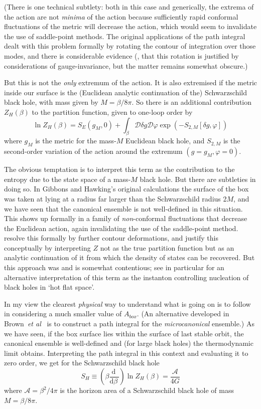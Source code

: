 \documentclass{article}
\newcommand{\dr}[1]{\ensuremath{\mathrm{d} #1\,}}
\newcommand{\mc}[1]{\ensuremath{\mathcal{#1}}}
\newcommand{\dbd}[2]{\ensuremath{\frac{\dr{#1}}{\dr{#2}}}}
\newcommand{\be}{\begin{equation}}
\newcommand{\ee}{\end{equation}}
\begin{document}
(There is one technical subtlety: both in this case and generically, the extrema of the action are not \emph{minima} of the action because sufficiently rapid conformal fluctuations of the metric will decrease the action, which would seem to invalidate the use of saddle-point methods. The original applications of the path integral \cite{gibbonshawkingperry} dealt with this problem formally by rotating the contour of integration over those modes, and there is considerable evidence (,  that this rotation is justified by considerations of gauge-invariance, but the matter remains somewhat obscure.)

But this is not the \emph{only} extremum of the action. It is also extremised if the metric inside our surface is the (Euclidean analytic continuation of the) Schwarzschild black hole, with mass given by $M=\beta/8 \pi$. So there is an additional contribution $Z_H(\beta)$ to the partition function, given to one-loop order by
\be \label{blackholepartition}
\ln Z_H(\beta) = S_E(g_M,0) + \int_\beta \mc{D}\delta g \mc{D}\varphi \exp(- S_{2,M}[\delta g,\varphi])
\ee
where $g_M$ is the metric for the mass-$M$ Euclidean black hole, and $S_{2,M}$ is the second-order variation of the action around the extremum $(g=g_M,\varphi=0)$. 

The obvious temptation is to interpret this term as the contribution to the entropy due to the state space of a mass-$M$ black hole. But there are subtleties in doing so. In Gibbons and Hawking's original calculations the surface of the box was taken at lying at a radius far larger than the Schwarzschild radius 2$M$, and we have seen that the canonical ensemble is not well-defined in this situation. This shows up formally in a family of \emph{non}-conformal fluctuations that decrease the Euclidean action, again invalidating the use of the saddle-point method.  resolve this formally by further contour deformations, and justify this conceptually by interpreting $Z$ not as the true partition function but as an analytic continuation of it from which the density of states can be recovered. But this approach was and is somewhat contentious; see in particular  for an alternative interpretation of this term as the instanton controlling nucleation of black holes in `hot flat space'.

In my view the clearest \emph{physical} way to understand what is going on is to follow  in considering a much smaller value of $A_{box}$. (An alternative developed in Brown~\emph{et al}~\citeyear{brownetalblackhole} is to construct a path integral for the \emph{microcanonical} ensemble.) As we have seen, if the box surface lies within the surface of last stable orbit, the canonical ensemble is well-defined and (for large black holes) the thermodynamic limit obtains. Interpreting the path integral in this context and evaluating it to zero order, we get for the Schwarzschild black hole
\be
S_H \equiv \left( \beta \dbd{}{\beta} \right) \ln Z_H(\beta) = \frac{\mc{A}}{4G}
\ee
where $\mc{A}= \beta^2/4\pi$ is the horizon area of a Schwarzschild black hole of mass $M=\beta/8\pi$.
\end{document}
